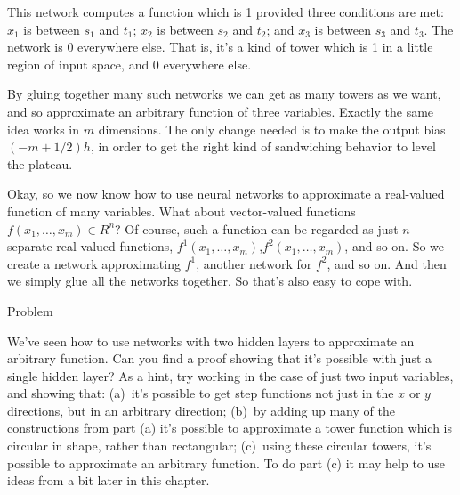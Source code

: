 \documentclass[a4paper,twoside,10pt]{book}
\begin{document}
This network computes a function which is 1 provided three conditions are met: $x_1$ is between $s_1$ and $t_1$; $x_2$ is between $s_2$ and $t_2$; and $x_3$ is between $s_3$ and $t_3$. The network is 0 everywhere else. That is, it's a kind of tower which is 1 in a little region of input space, and 0 everywhere else.

By gluing together many such networks we can get as many towers as we want, and so approximate an arbitrary function of three variables. Exactly the same idea works in $m$ dimensions. The only change needed is to make the output bias $(-m+1/2)h$, in order to get the right kind of sandwiching behavior to level the plateau.

Okay, so we now know how to use neural networks to approximate a real-valued function of many variables. What about vector-valued functions $f(x_1,\ldots,x_m)\in R^n$? Of course, such a function can be regarded as just $n$ separate real-valued functions, $f^1(x_1,\ldots,x_m)$,$f^2(x_1,\ldots,x_m)$, and so on. So we create a network approximating $f^1$, another network for $f^2$, and so on. And then we simply glue all the networks together. So that's also easy to cope with.

\begin{exercize}{Problem}
\item We've seen how to use networks with two hidden layers to approximate an arbitrary function. Can you find a proof showing that it's possible with just a single hidden layer? As a hint, try working in the case of just two input variables, and showing that: (a)~it's possible to get step functions not just in the $x$ or $y$ directions, but in an arbitrary direction; (b)~by adding up many of the constructions from part (a) it's possible to approximate a tower function which is circular in shape, rather than rectangular; (c)~using these circular towers, it's possible to approximate an arbitrary function. To do part (c) it may help to use ideas from a bit later in this chapter.
\end{exercize}
\end{document}
